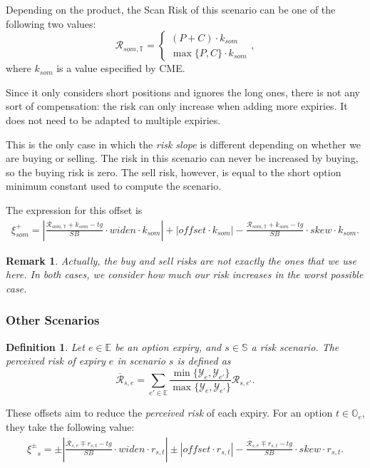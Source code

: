 \documentclass[10pt, a4paper, oneside]{article}
\newtheorem*{remark}{Remark}
\newtheorem*{definition}{Definition}
\newcommand{\somconst}{\ensuremath{k_{\mathit{som}}}}
\newcommand{\expiries}{\ensuremath{\mathbb{E}}}
\newcommand{\options}{\ensuremath{\mathbb{O}}}
\newcommand{\total}{\ensuremath{\mathbb{T}}}
\newcommand{\scenarios}{\ensuremath{\mathbb{S}}}
\newcommand{\yte}{\ensuremath{\mathcal{Y}}}
\newcommand{\risk}{\ensuremath{\mathcal{R}}}
\newcommand{\prisk}{\ensuremath{\overline{\risk}}}
\newcommand{\offsetbs}{\ensuremath{\xi^{\pm}}}
\newcommand{\target}{\ensuremath{\mathit{tg}}}
\newcommand{\widen}{\ensuremath{\mathit{widen}}}
\newcommand{\skw}{\ensuremath{\mathit{skew}}}
\newcommand{\offset}{\ensuremath{\mathit{offset}}}
\newcommand{\skewunits}[3]{\ensuremath{\frac{{#1}\mp{#2}-\target}{{#3}}}}
\newcommand{\offsetformula}[4]{{\begin{align*}\offsetbs_{#4}=\pm\left|\skewunits{#1}{#2}{#3}\cdot\widen\cdot{#2}\right| \pm \left|\offset\cdot{#2}\right| - \skewunits{#1}{#2}{#3}\cdot\skw\cdot{#2}.\end{align*}}}
\begin{document}
\noindent Depending on the product, the Scan Risk of this scenario can be one of the following two values:
\[\risk_{\mathit{som}, \total}=\left\{\begin{matrix}(P+C)\cdot\somconst\\\max\{P,C\}\cdot\somconst\end{matrix}\right.,\]
where $\somconst$ is a value especified by CME.

\noindent Since it only considers short positions and ignores the long ones, there is not any sort of compensation: the risk can only increase when adding more expiries. It does not need to be adapted to multiple expiries.

\noindent This is the only case in which the \emph{risk slope} is different depending on whether we are buying or selling. The risk in this scenario can never be increased by buying, so the buying risk is zero. The sell risk,
however, is equal to the short option minimum constant used to compute the scenario.

\noindent The expression for this offset is
\newcommand{\somskewunits}[3]{\ensuremath{\frac{{#1}+{#2}-\target}{{#3}}}}
\newcommand{\somoffsetformulatemp}[3]{\ensuremath{\xi^+_\mathit{som}=\left|\somskewunits{#1}{#2}{#3}\cdot\widen\cdot{#2}\right| + \left|\offset\cdot{#2}\right| - \somskewunits{#1}{#2}{#3}\cdot\skw\cdot{#2}.}}
\begin{align*}\somoffsetformulatemp{\risk_{\mathit{som}, \total}}{\somconst}{SB}\end{align*}

\begin{remark} Actually, the buy and sell risks are not exactly the ones that we use here. In both cases, we consider how much our risk increases in the worst possible case. \end{remark}

\subsubsection{Other Scenarios}

\begin{definition}
  Let $e \in \expiries$ be an option expiry, and $s \in \scenarios$ a risk scenario. The \emph{perceived risk} of expiry $e$ in scenario $s$ is defined as
  \[ \prisk_{s, e}=\sum_{e' \in \expiries}\frac{\min\{\yte_e, \yte_{e'}\}}{\max\{\yte_e, \yte_{e'}\}}\risk_{s, e'}.\]
\end{definition}

\noindent These offsets aim to reduce the \emph{perceived risk} of each expiry. For an option $t \in \options_e$, they take the following value:
\offsetformula{\prisk_{s, e}}{r_{s, t}}{SB}{s}
\end{document}

